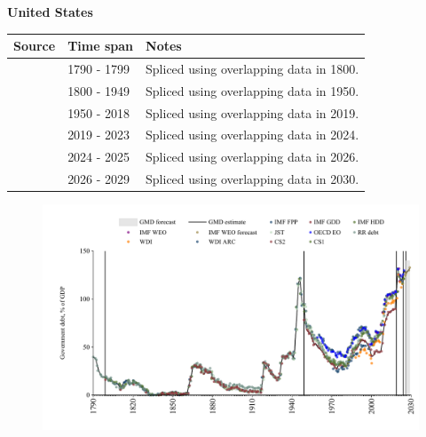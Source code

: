 \documentclass[12pt,a4paper,landscape]{article}
\begin{document}
\begin{adjustbox}{max totalsize={\paperwidth}{\paperheight},center}
\begin{minipage}[t][\textheight][t]{\textwidth}
\vspace*{0.5cm}
{}
\begin{center}
{\Large\bfseries United States}
\end{center}
\vspace{0.5cm}
\begin{table}[H]
\centering
\small
\begin{tabular}{|l|l|l|}
\hline
\textbf{Source} & \textbf{Time span} & \textbf{Notes} \\
\hline
\rowcolor{white}\cite{RR_debt}& 1790 - 1799 &Spliced using overlapping data in 1800.\\
\rowcolor{lightgray}\cite{IMF_FPP}& 1800 - 1949 &Spliced using overlapping data in 1950.\\
\rowcolor{white}\cite{IMF_GDD}& 1950 - 2018 &Spliced using overlapping data in 2019.\\
\rowcolor{lightgray}\cite{IMF_FPP}& 2019 - 2023 &Spliced using overlapping data in 2024.\\
\rowcolor{white}\cite{OECD_EO}& 2024 - 2025 &Spliced using overlapping data in 2026.\\
\rowcolor{lightgray}\cite{IMF_WEO_forecast}& 2026 - 2029 &Spliced using overlapping data in 2030.\\
\hline
\end{tabular}
\end{table}
\begin{figure}[H]
\centering
\includegraphics[width=\textwidth,height=0.6\textheight,keepaspectratio]{graphs/USA_govdebt_GDP.pdf}
\end{figure}
\end{minipage}
\end{adjustbox}
\end{document}
